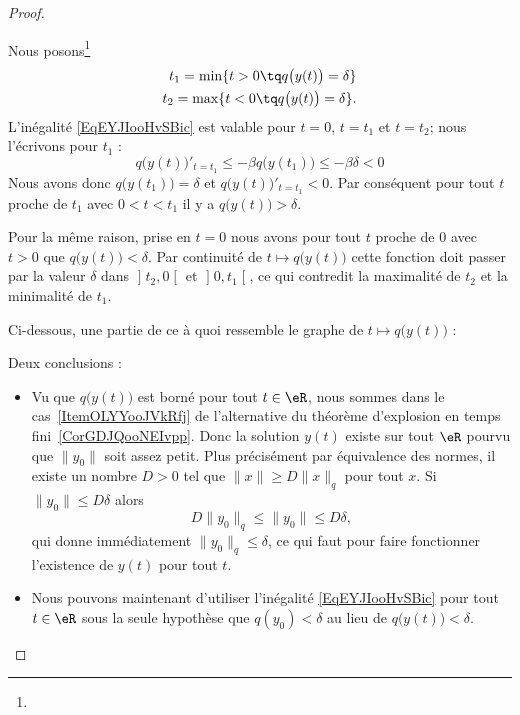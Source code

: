 \begin{proof}
\begin{subproof}

		Nous posons\footnote{}
		\begin{subequations}    \label{subeqsFNPJooERJkxO}
			\begin{align}
				t_1=\min\{ t>0\tq q\big( y(t) \big)=\delta \} \\
				t_2=\max\{ t<0\tq q\big( y(t) \big)=\delta \}.
			\end{align}
		\end{subequations}
		L'inégalité \eqref{EqEYJIooHvSBic} est valable pour \( t=0\), \( t=t_1\) et \( t=t_2\); nous l'écrivons pour \( t_1\) :
		\begin{equation}
			q\big( y(t) \big)'_{t=t_1}\leq-\beta q\big( y(t_1) \big)\leq-\beta \delta<0
		\end{equation}
		Nous avons donc \( q\big( y(t_1) \big)=\delta\) et \( q\big( y(t) \big)'_{t=t_1}<0\). Par conséquent pour tout \( t\) proche de \( t_1\) avec \( 0<t<t_1 \) il y a \( q\big( y(t) \big)>\delta\).


		Pour la même raison, prise en \( t=0\) nous avons pour tout \( t\) proche de \( 0\) avec \( t>0\) que \( q\big( y(t) \big)<\delta\). Par continuité de \( t\mapsto q\big( y(t) \big)\) cette fonction doit passer par la valeur \( \delta\) dans \( \mathopen] t_2 , 0 \mathclose[\) et \( \mathopen] 0 , t_1 \mathclose[\), ce qui contredit la maximalité de \( t_2\) et la minimalité de \( t_1\).

		Ci-dessous, une partie de ce à quoi ressemble le graphe de \( t\mapsto q\big( y(t) \big)\) :
		\begin{center}
			
		\end{center}

		Deux conclusions :
		\begin{itemize}
			\item
			      Vu que \( q\big( y(t) \big)\) est borné pour tout \( t\in \eR\), nous sommes dans le cas~\ref{ItemOLYYooJVkRfj} de l'alternative du théorème d'explosion en temps fini~\ref{CorGDJQooNEIvpp}. Donc la solution \( y(t)\) existe sur tout \( \eR\) pourvu que \( \| y_0 \|\) soit assez petit. Plus précisément par équivalence des normes, il existe un nombre \( D>0\) tel que \( \| x \|\geq D\| x \|_q\) pour tout \( x\). Si \( \| y_0 \|\leq D\delta\) alors
			      \begin{equation}
				      D\| y_0 \|_q\leq \| y_0 \|\leq D\delta,
			      \end{equation}
			      qui donne immédiatement \( \| y_0 \|_q\leq \delta\), ce qui faut pour faire fonctionner l'existence de \( y(t)\) pour tout \( t\).
			\item
			      Nous pouvons maintenant d'utiliser l'inégalité \eqref{EqEYJIooHvSBic} pour tout \( t\in \eR\) sous la seule hypothèse que \( q(y_0)<\delta\) au lieu de \( q\big( y(t) \big)<\delta\).
		\end{itemize}


\end{subproof}
\end{proof}
